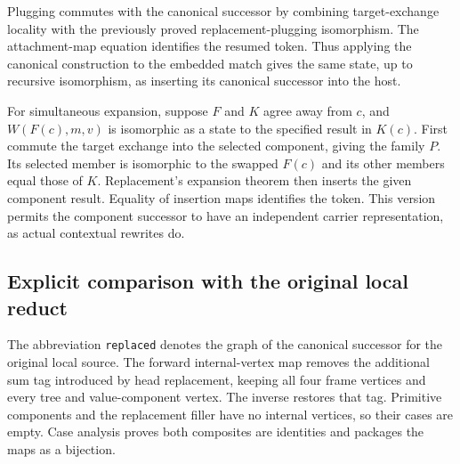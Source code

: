 
Plugging commutes with the canonical successor by combining target-exchange
locality with the previously proved replacement-plugging isomorphism.
The attachment-map equation identifies the resumed token. Thus applying the
canonical construction to the embedded match gives the same state, up to
recursive isomorphism, as inserting its canonical successor into the host.


For simultaneous expansion, suppose $F$ and $K$ agree away from $c$, and
$W(F(c),m,v)$ is isomorphic as a state to the specified result in $K(c)$.
First commute the target exchange into the selected component, giving the
family $P$. Its selected member is isomorphic to the swapped $F(c)$ and its
other members equal those of $K$. Replacement's expansion theorem then
inserts the given component result. Equality of insertion maps identifies
the token. This version permits the component successor to have an independent
carrier representation, as actual contextual rewrites do.


\subsection{Explicit comparison with the original local reduct}

The abbreviation \texttt{replaced} denotes the graph of the canonical
successor for the original local source. The forward internal-vertex map
removes the additional sum tag introduced by head replacement, keeping all
four frame vertices and every tree and value-component vertex. The inverse
restores that tag. Primitive components and the replacement filler have no
internal vertices, so their cases are empty. Case analysis proves both
composites are identities and packages the maps as a bijection.





